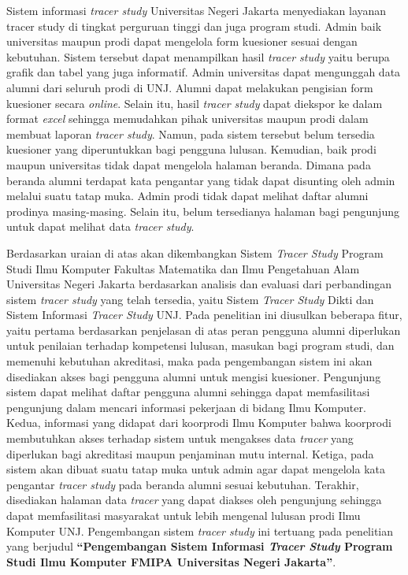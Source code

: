 Sistem informasi \textit{tracer study} Universitas Negeri Jakarta menyediakan layanan tracer study di tingkat perguruan tinggi dan juga program studi. Admin baik universitas maupun prodi dapat mengelola form kuesioner sesuai dengan kebutuhan. Sistem tersebut dapat menampilkan hasil \textit{tracer study} yaitu berupa grafik dan tabel yang juga informatif. Admin universitas dapat mengunggah data alumni dari seluruh prodi di UNJ. Alumni dapat melakukan pengisian form kuesioner secara \textit{online}. Selain itu, hasil\textit{ tracer study} dapat diekspor ke dalam format \textit{excel} sehingga memudahkan pihak universitas maupun prodi dalam membuat laporan \textit{tracer study}. Namun, pada sistem tersebut belum tersedia kuesioner yang diperuntukkan bagi pengguna lulusan. Kemudian, baik prodi maupun universitas tidak dapat mengelola halaman beranda. Dimana pada beranda alumni terdapat kata pengantar yang tidak dapat disunting oleh admin melalui suatu tatap muka. Admin prodi tidak dapat melihat daftar alumni prodinya masing-masing. Selain itu, belum tersedianya halaman bagi pengunjung untuk dapat melihat data \textit{tracer study}. 

Berdasarkan uraian di atas akan dikembangkan Sistem \textit{Tracer Study} Program Studi Ilmu Komputer Fakultas Matematika dan Ilmu Pengetahuan Alam Universitas Negeri Jakarta berdasarkan analisis dan evaluasi dari perbandingan sistem \textit{tracer study} yang telah tersedia, yaitu Sistem \textit{Tracer Study} Dikti dan Sistem Informasi \textit{Tracer Study} UNJ. Pada penelitian ini diusulkan beberapa fitur, yaitu pertama berdasarkan penjelasan di atas peran pengguna alumni diperlukan untuk penilaian terhadap kompetensi lulusan, masukan bagi program studi, dan memenuhi kebutuhan akreditasi, maka pada pengembangan sistem ini akan disediakan akses bagi pengguna alumni untuk mengisi kuesioner. Pengunjung sistem dapat melihat daftar pengguna alumni sehingga dapat memfasilitasi pengunjung dalam mencari informasi pekerjaan di bidang Ilmu Komputer. Kedua, informasi yang didapat dari koorprodi Ilmu Komputer bahwa koorprodi membutuhkan akses terhadap sistem untuk mengakses data \textit{tracer} yang diperlukan bagi akreditasi maupun penjaminan mutu internal. Ketiga, pada sistem akan dibuat suatu tatap muka untuk admin agar dapat mengelola kata pengantar \textit{tracer study} pada beranda alumni sesuai kebutuhan. Terakhir, disediakan halaman data \textit{tracer} yang dapat diakses oleh pengunjung sehingga dapat memfasilitasi masyarakat untuk lebih mengenal lulusan prodi Ilmu Komputer UNJ. Pengembangan sistem \textit{tracer study} ini tertuang pada penelitian yang berjudul \textbf{“Pengembangan Sistem Informasi \textit{Tracer Study} Program Studi Ilmu Komputer FMIPA Universitas Negeri Jakarta”}.

